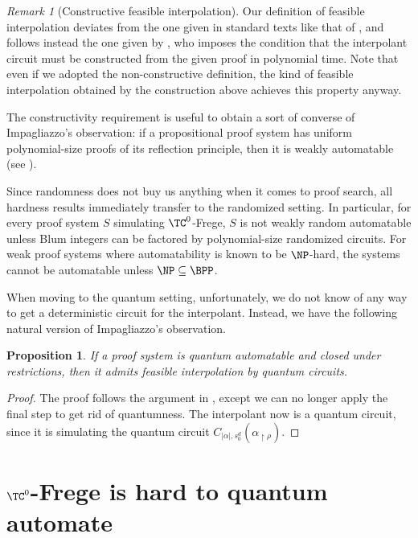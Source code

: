 \documentclass[11pt]{article}
\theoremstyle{definition}
\theoremstyle{plain}
\newtheorem{proposition}[definition]{Proposition}
\theoremstyle{remark}
\newtheorem{remark}[definition]{Remark}
\begin{document}
\begin{remark}[Constructive feasible interpolation]
\label{rem:constructive}
    Our definition of feasible interpolation deviates from the one given in standard texts like that of \citeauthor{krajicekBOOK} \cite{krajicekBOOK}, and follows instead the one given by \citeauthor{pudlak03} \cite{pudlak03}, who imposes the condition that the interpolant circuit must be constructed from the given proof in polynomial time. Note that even if we adopted the non-constructive definition, the kind of feasible interpolation obtained by the construction above achieves this property anyway.

    The constructivity requirement is useful to obtain a sort of converse of Impagliazzo's observation: if a propositional proof system has uniform polynomial-size proofs of its reflection principle, then it is weakly automatable (see \autocite[Prop. 3.6]{pudlak03}).
\end{remark}

Since randomness does not buy us anything when it comes to proof search, all hardness results immediately transfer to the randomized setting. In particular, for every proof system $S$ simulating $\TC^0$-Frege, $S$ is not weakly random automatable unless Blum integers can be factored by polynomial-size randomized circuits. For weak proof systems where automatability is known to be $\NP$-hard, the systems cannot be automatable unless $\NP \subseteq \BPP$.

When moving to the quantum setting, unfortunately, we do not know of any way to get a deterministic circuit for the interpolant. Instead, we have the following natural version of Impagliazzo's observation.

\begin{proposition}
\label{prop:quant-impa}
    If a proof system is quantum automatable and closed under restrictions, then it admits feasible interpolation by quantum circuits. 
\end{proposition}

\begin{proof}
    The proof follows the argument in , except we can no longer apply the final step to get rid of quantumness. The interpolant now is a quantum circuit, since it is simulating the quantum circuit $C_{|\alpha|, {s_0^{d}}}(\alpha_{\restriction \rho})$.
\end{proof}


\section{$\TC^0$-Frege is hard to quantum automate}
\label{sec:outline}
\end{document}
